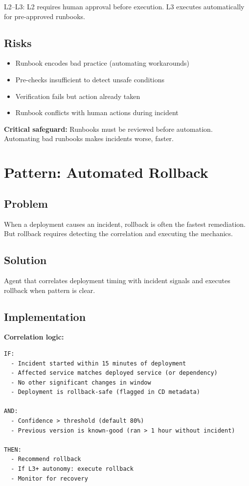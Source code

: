 L2--L3: L2 requires human approval before execution. L3 executes automatically for pre-approved runbooks.

\subsection{Risks}

\begin{itemize}
    \item Runbook encodes bad practice (automating workarounds)
    \item Pre-checks insufficient to detect unsafe conditions
    \item Verification fails but action already taken
    \item Runbook conflicts with human actions during incident
\end{itemize}

\textbf{Critical safeguard:} Runbooks must be reviewed before automation. Automating bad runbooks makes incidents worse, faster.

\section{Pattern: Automated Rollback}
\label{sec:automated-rollback}

\subsection{Problem}

When a deployment causes an incident, rollback is often the fastest remediation. But rollback requires detecting the correlation and executing the mechanics.

\subsection{Solution}

Agent that correlates deployment timing with incident signals and executes rollback when pattern is clear.

\subsection{Implementation}

\textbf{Correlation logic:}

\begin{lstlisting}[caption={Rollback Correlation Logic}]
IF:
  - Incident started within 15 minutes of deployment
  - Affected service matches deployed service (or dependency)
  - No other significant changes in window
  - Deployment is rollback-safe (flagged in CD metadata)

AND:
  - Confidence > threshold (default 80%)
  - Previous version is known-good (ran > 1 hour without incident)

THEN:
  - Recommend rollback
  - If L3+ autonomy: execute rollback
  - Monitor for recovery
\end{lstlisting}

